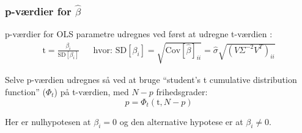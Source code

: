 \subsubsection{p-værdier for $\hat{\beta}$}

p-værdier for OLS parametre udregnes ved først at udregne t-værdien \cite{t-value-ols}:
\begin{align}
\mathrm{t} = \frac{\beta_i}{\mathrm{SD}[\beta_i]} && \text{hvor: } \mathrm{SD}[\beta_i] = \sqrt{\mathrm{Cov}[\hat{\beta}]_{ii}} = \hat{\sigma} \sqrt{ (V \Sigma^{-2} V^T)_{ii} }
\end{align}

Selve p-værdien udregnes så ved at bruge ``student's t cumulative distribution function'' ($\Phi_t$) på t-værdien, med $N - p$ frihedsgrader:
\begin{equation}
p = \Phi_t\left(\mathrm{t}, N-p\right)
\end{equation}

Her er nulhypotesen at $\beta_i = 0$ og den alternative hypotese er at $\beta_i \not = 0$.
